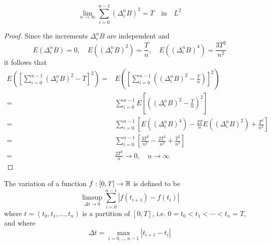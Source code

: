 \begin{theorem} \label{thm:limited-square-variation}
	\begin{equation}
		\lim_{n\rightarrow\infty}\sum_{i=0}^{n-1}\left(\Delta_{i}^{n}B\right)^{2}=T\quad\text {in}\quad L^{2}
	\end{equation}
\end{theorem}

\begin{proof}
	Since the increments $\Delta_{i}^{n}B$ are independent and
	\begin{equation*}
		E\left(\Delta_{i}^{n}B\right)=0,\quad E\left(\left(\Delta_{i}^{n}B\right)^{2}\right)=\frac{T}{n},\quad E\left(\left(\Delta_{i}^{n}B\right)^{4}\right)=\frac{3T^{2}}{n^{2}}
	\end{equation*}
	it follows that
	\begin{equation*}
		\begin{aligned}
			E\left(\left[\sum_{i=0}^{n-1}\left(\Delta_{i}^{n}B\right)^{2}-T\right]^{2}\right)= & E\left(\left[\sum_{i=0}^{n-1}\left(\left(\Delta_{i}^{n}B\right)^{2}-\frac{T}{n}\right)\right]^{2}\right)                                                   \\
			=                                                                                  & \sum_{i=0}^{n-1}E\left[\left(\left(\Delta_{i}^{n}B\right)^{2}-\frac{T}{n}\right)^{2}\right]                                                                \\
			=                                                                                  & \sum_{i=0}^{n-1}\left[E\left(\left(\Delta_{i}^{n}B\right)^{4}\right)-\frac{2T}{n}E\left(\left(\Delta_{i}^{n}B\right)^{2}\right)+\frac{T^{2}}{n^{2}}\right] \\
			=                                                                                  & \sum_{i=0}^{n-1}\left[\frac{3T^{2}}{n^{2}}-\frac{2T^{2}}{n^{2}}+\frac{T^{2}}{n^{2}}\right]                                                                 \\
			=                                                                                  & \frac{2T^{2}}{n}\rightarrow 0,\quad n\rightarrow\infty
		\end{aligned}
	\end{equation*}
\end{proof}

\begin{definition}[Variation]
	The variation of a function $f:[0,T]\rightarrow{\mathbb R}$ is defined to be
	\begin{equation}
		\limsup_{\Delta t\rightarrow 0}\sum_{i=0}^{n-1}\left|f\left(t_{i+1}\right)-f\left(t_{i}\right)\right|
	\end{equation}
	where $t=\left(t_{0},t_{1},\ldots,t_{n}\right)$ is a partition of $[0,T]$, i.e. $0=t_{0}<t_{1}<\cdots<t_{n}=T$, and where
	\begin{equation}
		\Delta t=\max_{i=0,\ldots,n-1}\left|t_{i+1}-t_{i}\right|
	\end{equation}
\end{definition}

